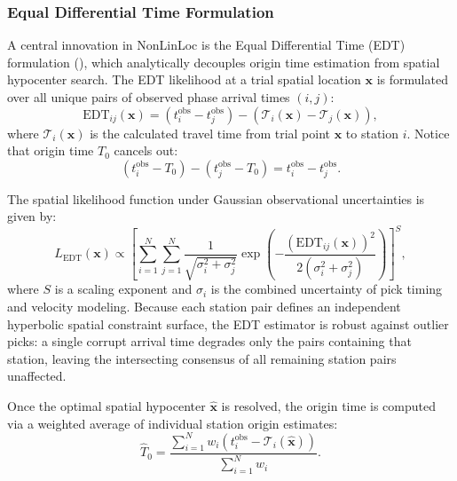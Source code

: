 \subsubsection{Equal Differential Time Formulation}
A central innovation in NonLinLoc is the Equal Differential Time (\ac{EDT}) formulation (\cite{NonLinLoc}), which analytically decouples origin time estimation from spatial hypocenter search. The EDT likelihood at a trial spatial location $\mathbf{x}$ is formulated over all unique pairs of observed phase arrival times $(i, j)$:
\begin{equation}
  \mathrm{EDT}_{ij}(\mathbf{x}) = \left( t_i^{\mathrm{obs}} - t_j^{\mathrm{obs}} \right) - \left( \mathcal{T}_i(\mathbf{x}) - \mathcal{T}_j(\mathbf{x}) \right),
\end{equation}
where $\mathcal{T}_i(\mathbf{x})$ is the calculated travel time from trial point $\mathbf{x}$ to station $i$. Notice that origin time $T_0$ cancels out:
\begin{equation}
  (t_i^{\mathrm{obs}} - T_0) - (t_j^{\mathrm{obs}} - T_0) = t_i^{\mathrm{obs}} - t_j^{\mathrm{obs}}.
\end{equation}

The spatial likelihood function under Gaussian observational uncertainties is given by:
\begin{equation}
  L_{\mathrm{EDT}}(\mathbf{x}) \propto \left[ \sum_{i=1}^N \sum_{j=1}^N \frac{1}{\sqrt{\sigma_i^2 + \sigma_j^2}} \exp\left( - \frac{\left( \mathrm{EDT}_{ij}(\mathbf{x}) \right)^2}{2(\sigma_i^2 + \sigma_j^2)} \right) \right]^S,
\end{equation}
where $S$ is a scaling exponent and $\sigma_i$ is the combined uncertainty of pick timing and velocity modeling. Because each station pair defines an independent hyperbolic spatial constraint surface, the EDT estimator is robust against outlier picks: a single corrupt arrival time degrades only the pairs containing that station, leaving the intersecting consensus of all remaining station pairs unaffected.

Once the optimal spatial hypocenter $\hat{\mathbf{x}}$ is resolved, the origin time is computed via a weighted average of individual station origin estimates:
\begin{equation}
  \hat{T}_0 = \frac{\sum_{i=1}^N w_i \left( t_i^{\mathrm{obs}} - \mathcal{T}_i(\hat{\mathbf{x}}) \right)}{\sum_{i=1}^N w_i}.
\end{equation}

